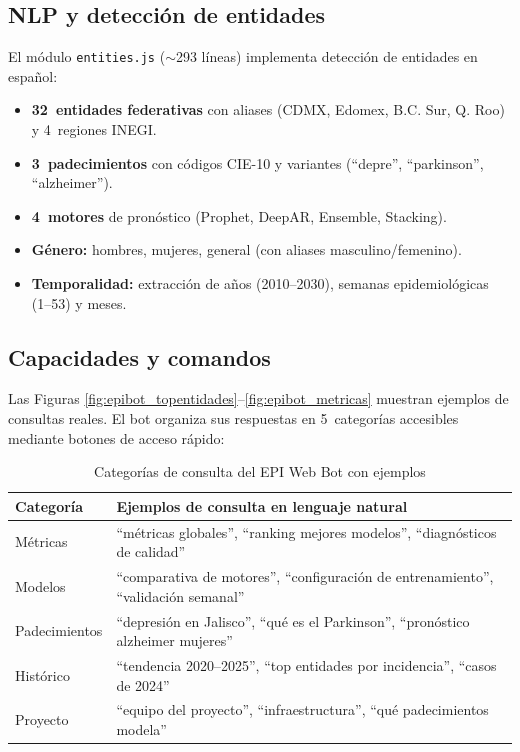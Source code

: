 \documentclass[12pt, letterpaper]{article}
\begin{document}
\subsection{NLP y detección de entidades}

El módulo \texttt{entities.js} ($\sim$293 líneas) implementa detección de entidades en español:

\begin{itemize}
  \item \textbf{32~entidades federativas} con aliases (CDMX, Edomex, B.C. Sur, Q. Roo) y 4~regiones INEGI.
  \item \textbf{3~padecimientos} con códigos CIE-10 y variantes (``depre'', ``parkinson'', ``alzheimer'').
  \item \textbf{4~motores} de pronóstico (Prophet, DeepAR, Ensemble, Stacking).
  \item \textbf{Género:} hombres, mujeres, general (con aliases masculino/femenino).
  \item \textbf{Temporalidad:} extracción de años (2010--2030), semanas epidemiológicas (1--53) y meses.
\end{itemize}

\subsection{Capacidades y comandos}

Las Figuras \ref{fig:epibot_topentidades}--\ref{fig:epibot_metricas} muestran ejemplos de consultas reales. El bot organiza sus respuestas en 5~categorías accesibles mediante botones de acceso rápido:

\begin{table}[H]
\centering
\caption{Categorías de consulta del EPI Web Bot con ejemplos}
\label{tab:comandos_epibot}
\small
\begin{tabularx}{\textwidth}{l X}
\toprule
\textbf{Categoría} & \textbf{Ejemplos de consulta en lenguaje natural} \\
\midrule
Métricas      & ``métricas globales'', ``ranking mejores modelos'', ``diagnósticos de calidad'' \\
\addlinespace
Modelos       & ``comparativa de motores'', ``configuración de entrenamiento'', ``validación semanal'' \\
\addlinespace
Padecimientos & ``depresión en Jalisco'', ``qué es el Parkinson'', ``pronóstico alzheimer mujeres'' \\
\addlinespace
Histórico     & ``tendencia 2020--2025'', ``top entidades por incidencia'', ``casos de 2024'' \\
\addlinespace
Proyecto      & ``equipo del proyecto'', ``infraestructura'', ``qué padecimientos modela'' \\
\bottomrule
\end{tabularx}
\end{table}
\end{document}

